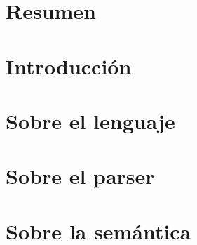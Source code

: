\documentclass[twoside]{report}
\begin{document}


\chapter*{Resumen}


\tableofcontents

\chapter{Introducción}


\chapter{Sobre el lenguaje}

\chapter{Sobre el parser}

\chapter{Sobre la semántica}
\parencite{Reynolds}

\printbibliography
\end{document}
